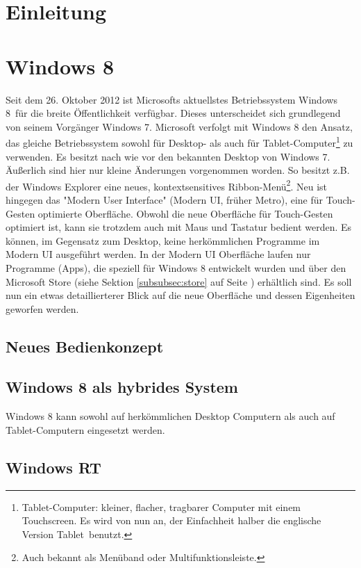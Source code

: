 \documentclass[12pt,a4paper]{scrartcl}
\author{Malte Modrow}
\begin{document}
\tableofcontents

\newpage
\section{Einleitung}
\label{sec:einleitung}
\newpage
\section{Windows 8}
\label{sec:windows8}
Seit dem 26. Oktober 2012 ist Microsofts aktuellstes Betriebssystem \glqq Windows 8\grqq\ für die breite Öffentlichkeit verfügbar. Dieses unterscheidet sich grundlegend von seinem Vorgänger \glqq Windows 7\grqq. Microsoft verfolgt mit Windows 8 den Ansatz, das gleiche Betriebssystem sowohl für Desktop- als auch für Tablet-Computer\footnote{Tablet-Computer: kleiner, flacher, tragbarer Computer mit einem Touchscreen. Es wird von nun an, der Einfachheit halber die englische Version \glqq Tablet\grqq\ benutzt.} zu verwenden. Es besitzt nach wie vor den bekannten Desktop von Windows 7. Äußerlich sind hier nur kleine Änderungen vorgenommen worden. So besitzt z.B. der Windows Explorer eine neues, kontextsensitives Ribbon-Menü\footnote{Auch bekannt als Menüband oder Multifunktionsleiste.}. Neu ist hingegen das "Modern User Interface" (Modern UI, früher Metro), eine für Touch-Gesten optimierte Oberfläche. Obwohl die neue Oberfläche für Touch-Gesten optimiert ist, kann sie trotzdem auch mit Maus und Tastatur bedient werden. Es können, im Gegensatz zum Desktop, keine herkömmlichen Programme im Modern UI ausgeführt werden. In der Modern UI Oberfläche laufen nur Programme (Apps), die speziell für Windows 8 entwickelt wurden und über den Microsoft Store (siehe Sektion \ref{subsubsec:store} auf Seite \pageref{subsubsec:store}) erhältlich sind. Es soll nun ein etwas detaillierterer Blick auf die neue Oberfläche und dessen Eigenheiten geworfen werden.
\subsection{Neues Bedienkonzept}
\label{subsec:bedienkonzept}

\subsection{Windows 8 als hybrides System}
\label{subsec:hybrides system}
Windows 8 kann sowohl auf herkömmlichen Desktop Computern als auch auf Tablet-Computern eingesetzt werden. 
\subsection{Windows RT}
\label{subsec:winRT}
\end{document}
